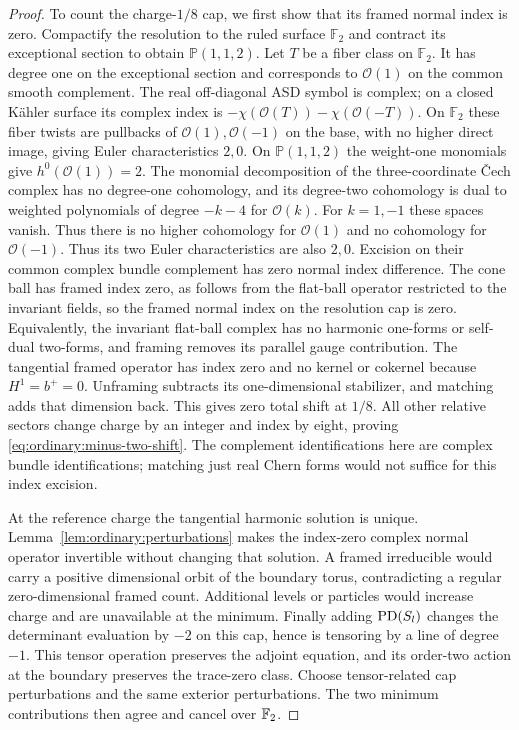 \begin{proof}
To count the charge-$1/8$ cap, we first show that its framed normal
index is zero.  Compactify the resolution to the ruled surface $\mathbb F_2$ and contract its
exceptional section to obtain $\mathbb P(1,1,2)$.  Let $T$
be a fiber class on $\mathbb F_2$.  It has degree one on the
exceptional section and corresponds to $\mathcal O(1)$ on
the common smooth complement.  The real off-diagonal ASD
symbol is complex; on a closed K\"ahler surface its complex
index is
$-\chi(\mathcal O(T))-\chi(\mathcal O(-T))$.
On $\mathbb F_2$ these fiber twists are pullbacks of
$\mathcal O(1),\mathcal O(-1)$ on the base, with no higher
direct image, giving Euler characteristics $2,0$.  On
$\mathbb P(1,1,2)$ the weight-one monomials give
$h^0(\mathcal O(1))=2$.  The monomial decomposition of the
three-coordinate \v{C}ech complex has no degree-one cohomology,
and its degree-two cohomology is dual to weighted polynomials
of degree $-k-4$ for $\mathcal O(k)$.  For $k=1,-1$ these
spaces vanish.  Thus there is no higher cohomology for
$\mathcal O(1)$ and no cohomology for $\mathcal O(-1)$.
Thus its two Euler characteristics are also $2,0$.
Excision on their common complex bundle complement has zero
normal index difference.  The cone ball has framed index
zero, as follows from the flat-ball operator restricted to
the invariant fields, so the framed normal index on the
resolution cap is zero.  Equivalently, the invariant flat-ball
complex has no harmonic one-forms or self-dual two-forms,
and framing removes its parallel gauge contribution.
The tangential framed operator has
index zero and no kernel or cokernel because $H^1=b^+=0$.
Unframing subtracts its one-dimensional stabilizer, and
matching adds that dimension back.  This gives zero total
shift at $1/8$.  All other relative sectors change charge
by an integer and index by eight, proving
\eqref{eq:ordinary:minus-two-shift}.  The complement
identifications here are complex bundle identifications;
matching just real Chern forms would not suffice for this
index excision.

At the reference charge the tangential harmonic solution is
unique.  Lemma~\ref{lem:ordinary:perturbations} makes the
index-zero complex normal operator invertible without changing
that solution.  A framed irreducible would carry a positive
dimensional orbit of the boundary torus, contradicting a
regular zero-dimensional framed count.  Additional levels or
particles would increase charge and are unavailable at the
minimum.  Finally adding $\operatorname{PD}(S_l)$ changes the determinant
evaluation by $-2$ on this cap, hence is tensoring by a line
of degree $-1$.  This tensor operation preserves the adjoint
equation, and its order-two action at the boundary preserves
the trace-zero class.  Choose tensor-related cap perturbations
and the same exterior perturbations.  The two minimum
contributions then agree and cancel over $\mathbb F_2$.
\end{proof}

